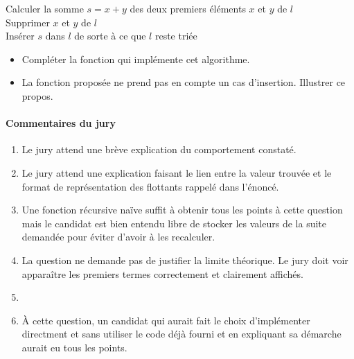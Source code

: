 \documentclass[a4paper, 11pt]{article}
\newenvironment{pcode-nl-env}
  {
    \IncMargin{0.2cm}
    \LinesNumberedHidden
    \begin{algorithm}[H]
    \DontPrintSemicolon
    }{\end{algorithm}}
\begin{document}
\begin{enumerate}
\begin{center}
\begin{minipage}{15cm}
\begin{pcode-nl-env}
  {
    Calculer la somme $s = x+y$ des deux premiers éléments $x$ et $y$ de $l$ \\
    Supprimer $x$ et $y$ de $l$ \\
    Insérer $s$ dans $l$ de sorte à ce que $l$ reste triée
  }
\end{pcode-nl-env}
  \end{minipage}
\end{center}

\begin{itemize}
	\item Compléter la fonction  qui implémente cet algorithme.
	\item La fonction proposée ne prend pas en compte un cas d'insertion. Illustrer ce propos.
\end{itemize}

    \end{enumerate}

\paragraph{Commentaires du jury}

\begin{enumerate}
\item Le jury attend une brève explication du comportement constaté.
\item Le jury attend une explication faisant le lien entre la valeur trouvée et le format de représentation des flottants rappelé dans l'énoncé.
\item Une fonction récursive naïve suffit à obtenir tous les points à cette question mais le candidat est bien entendu libre de stocker les valeurs de la suite demandée pour éviter d'avoir à les recalculer.
\item La question ne demande pas de justifier la limite théorique. Le jury doit voir apparaître les premiers termes correctement et clairement affichés.
\item
\item À cette question, un candidat qui aurait fait le choix d'implémenter  directment et sans utiliser le code déjà fourni et en expliquant sa démarche aurait eu tous les points.
\end{enumerate}
\end{document}
